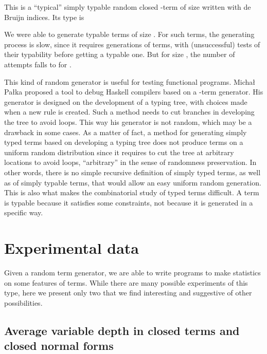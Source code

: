 \documentclass{jfp1}
\begin{document}
This is a ``typical'' simply typable random closed -term of size  written with de
Bruijn indices.  Its type is

\begin{center}
  

    
\end{center}

We were able to generate typable terms of size .
For such terms, the generating process is slow, since it requires  generations of
terms, with (unsuccessful) tests of their typability before getting a typable one.  But for
size , 
the number of attempts falls to  for .


This kind of random generator is useful for testing functional programs. Micha{\l}
Pa{\l}ka \cite{palka12:_testin_compil,Palka:2011:TOC:1982595.1982615} proposed a tool
to debug Haskell compilers based on a -term generator.  His generator is
designed on the development of a typing tree, with choices made when a new rule is
created.  Such a method needs to cut branches in developing the tree to avoid loops.
This way his generator is not random, which may be a drawback in some cases.  As a
matter of fact, a method for generating simply typed terms based on developing a
typing tree does not produce terms on a uniform random distribution since it requires
to cut the tree at arbitrary locations to avoid loops, ``arbitrary'' in the sense of
randomness preservation.  In other words, there is no simple recursive definition of
simply typed terms, as well as of simply typable terms,  that would allow an easy uniform random generation.  This is also
what makes the combinatorial study of typed terms difficult.  A term is typable
because it satisfies some constraints, not because it is generated in a specific way.

\section{Experimental data}
\label{sec:exper-data}

Given a random term generator, we are able to write programs to make statistics on some
features of terms.  While there are many possible experiments of this type, here we
present only two that we find interesting and suggestive of other possibilities. 






\subsection{Average variable depth in closed terms and closed normal forms}
\label{sec:avearge-depth-var}
\end{document}
